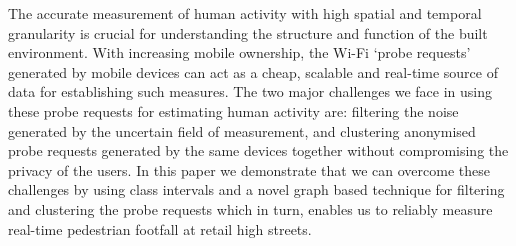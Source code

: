 The accurate measurement of human activity with high spatial and temporal
granularity is crucial for understanding the structure and function of the built
environment.  With increasing mobile ownership, the Wi-Fi `probe requests'
generated by mobile devices can act as a cheap, scalable and real-time source of
data for establishing such measures.  The two major challenges we face in using
these probe requests for estimating human activity are: filtering the noise
generated by the uncertain field of measurement, and clustering anonymised probe
requests generated by the same devices together without compromising the privacy
of the users.  In this paper we demonstrate that we can overcome these
challenges by using class intervals and a novel graph based technique for
filtering and clustering the probe requests which in turn, enables us to
reliably measure real-time pedestrian footfall at retail high streets.

